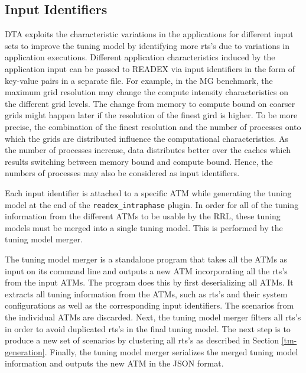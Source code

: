 \subsection{Input Identifiers} \label{sec:input}

DTA exploits the characteristic variations in the applications for different input sets to improve the tuning model by identifying more rts's due to variations in application executions. Different application characteristics induced by the application input can be passed to READEX via input identifiers in the form of key-value pairs in a separate file. For example, in the MG benchmark, the maximum grid resolution may change the compute intensity characteristics on the different grid levels. The change from memory to compute bound on coarser grids might happen later if the resolution of the finest gird is higher. To be more precise, the combination of the finest resolution and the number of processes onto which the grids are distributed influence the computational characteristics. As the number of processes increase, data distributes better over the caches which results switching between memory bound and compute bound. Hence, the numbers of processes may also be considered as input identifiers. 

Each input identifier is attached to a specific ATM while generating the tuning model at the end of the \texttt{readex\_intraphase} plugin. In order for all of the tuning information from the different ATMs to be usable by the RRL, these tuning models must be merged into a single tuning model. This is performed by the tuning model merger.

The tuning model merger is a standalone program that takes all the ATMs as input on its command line and outputs a new ATM incorporating all the rts's from the input ATMs. The program does this by first deserializing all ATMs. It extracts all tuning information from the ATMs, such as rts's and their system configurations as well as the corresponding input identifiers. The scenarios from the individual ATMs are discarded. Next, the tuning model merger filters all rts's in order to avoid duplicated rts's in the final tuning model. The next step is to produce a new set of scenarios by clustering all rts's as described in Section \ref{tm-generation}. Finally, the tuning model merger serializes the merged tuning model information and outputs the new ATM in the JSON format.
